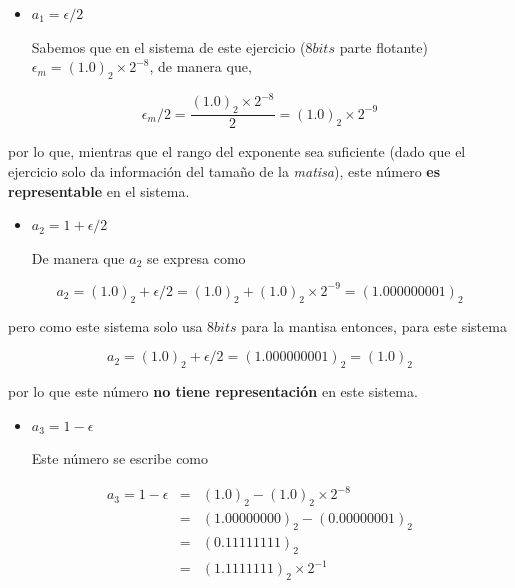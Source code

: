 \documentclass[11pt]{article}
\providecommand{\tightlist}{%
      \setlength{\itemsep}{0pt}\setlength{\parskip}{0pt}}
\begin{document}
    \begin{itemize}
\tightlist
\item
  \(a_1 = \epsilon/2\)

  \par

  Sabemos que en el sistema de este ejercicio (\(8bits\) parte flotante)
  \(\epsilon_m = (1.0)_2 \times 2^{-8}\), de manera que,
\end{itemize}

\begin{equation*} \epsilon_m/2 = \frac{(1.0)_2 \times 2^{-8}}{2} = (1.0)_2 \times 2^{-9}
 \end{equation*}

por lo que, mientras que el rango del exponente sea suficiente (dado que
el ejercicio solo da información del tamaño de la \textit{matisa}), este
número \textbf{es representable} en el sistema.

\begin{itemize}
\tightlist
\item
  \(a_2 = 1+ \epsilon/2\)

  \par

  De manera que \(a_2\) se expresa como
\end{itemize}

\begin{equation*} a_2 = (1.0)_2 + \epsilon/2 = (1.0)_2 + (1.0)_2 \times 2^{-9} = (1.000000001)_2
 \end{equation*}

pero como este sistema solo usa \(8bits\) para la mantisa entonces, para
este sistema

\begin{equation*} a_2 = (1.0)_2 + \epsilon/2 = (1.000000001)_2 = (1.0)_2
 \end{equation*}

por lo que este número \textbf{no tiene representación} en este sistema.

\begin{itemize}
\tightlist
\item
  \(a_3 = 1- \epsilon\)

  \par

  Este número se escribe como
\end{itemize}

\begin{eqnarray*} 
     a_3 = 1- \epsilon &=& (1.0)_2 - (1.0)_2 \times 2^{-8} \\
         &=& (1.00000000)_2 - (0.00000001)_2 \\
         &=& (0.11111111)_2 \\
         &=& (1.1111111)_2 \times 2^{-1}
 \end{eqnarray*}
\end{document}
